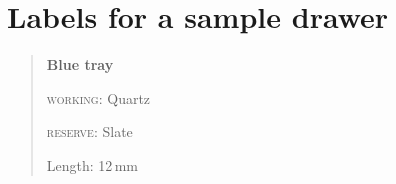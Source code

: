 \documentclass{article}
\newcommand{\sample}[2][working]{\textsc{#1}: #2}
\def\unitmark#1{Length: #1\,mm}
\newenvironment{drawer}[1]{\begin{quote}\textbf{#1}\par}{\end{quote}}
\begin{document}
\section*{Labels for a sample drawer}

\begin{drawer}{Blue tray}
\sample{Quartz}\par\sample[reserve]{Slate}\par\unitmark{12}
\end{drawer}
\end{document}
